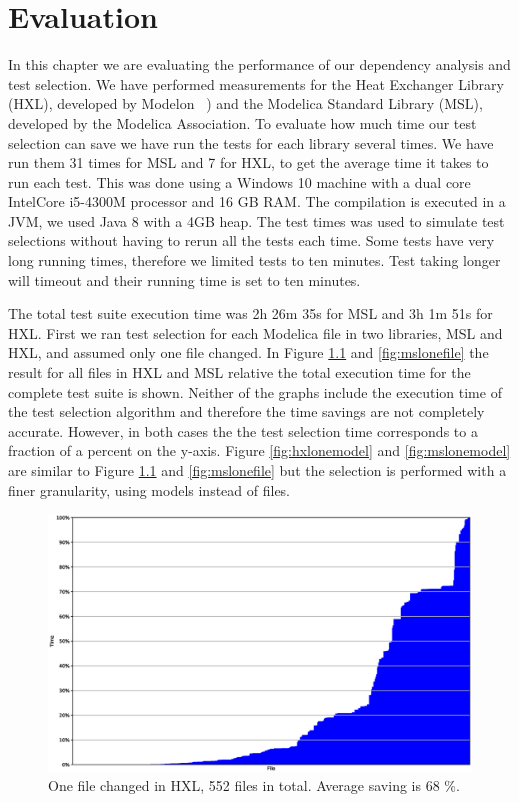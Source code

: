 \documentclass{cslthse-msc}
\begin{document}
\chapter[Evaluation]{Evaluation}
In this chapter we are evaluating the performance of our dependency analysis and test selection. We have performed measurements for the Heat Exchanger Library (HXL), developed by Modelon ~\cite{modelon.comHXL}) and the Modelica Standard Library (MSL), developed by the Modelica Association. To evaluate how much time our test selection can save we have run the tests for each library several times. We have run them 31 times for MSL and 7 for HXL, to get the average time it takes to run each test. This was done using a Windows 10 machine with a dual core Intel\textregistered Core \texttrademark i5-4300M processor and 16 GB RAM. The compilation is executed in a JVM, we used Java 8 with a 4GB heap. The test times was used to simulate test selections without having to rerun all the tests each time. Some tests have very long running times, therefore we limited tests to ten minutes. Test taking longer will timeout and their running time is set to ten minutes.

The total test suite execution time was 2h 26m 35s for MSL and 3h 1m 51s for HXL. First we ran test selection for each Modelica file in two libraries, MSL and HXL, and assumed only one file changed.  In Figure \ref{fig:hxlonefile} and \ref{fig:mslonefile} the result for all files in HXL and MSL relative the total execution time for the complete test suite is shown. Neither of the graphs include the execution time of the test selection algorithm and therefore the time savings are not completely accurate. However, in both cases the the test selection time corresponds to a fraction of a percent on the y-axis. Figure \ref{fig:hxlonemodel} and \ref{fig:mslonemodel} are similar to Figure \ref{fig:hxlonefile} and \ref{fig:mslonefile} but the selection is performed with a finer granularity, using models instead of files. 

\begin{figure}[!htbp]
    \centering
    \includegraphics[width=\textwidth]{Graphs/HXL_one_file.eps}
    \caption{One file changed in HXL, 552 files in total. Average saving is 68 \%.}
    \label{fig:hxlonefile}
\end{figure}
\end{document}
